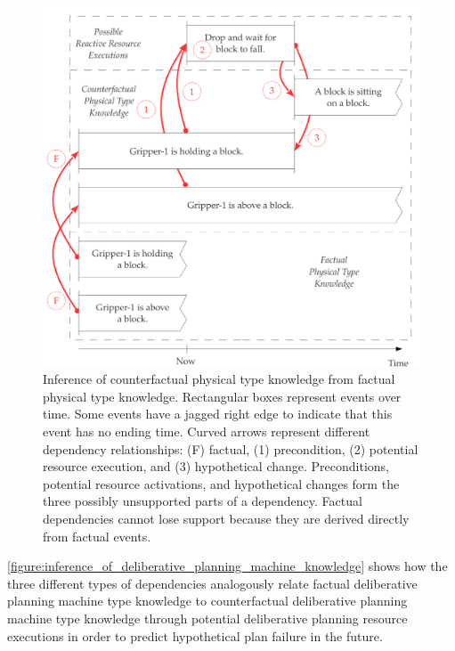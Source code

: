 \begin{figure}[h]
\centering
\includegraphics[width=12cm]{gfx/inference_of_physical_knowledge}
\caption[Inference of counterfactual physical type knowledge from
  factual physical type knowledge.]{Inference of counterfactual
  physical type knowledge from factual physical type knowledge.
  Rectangular boxes represent events over time.  Some events have a
  jagged right edge to indicate that this event has no ending time.
  Curved arrows represent different dependency relationships: (F)
  factual, (1) precondition, (2) potential resource execution, and (3)
  hypothetical change.  Preconditions, potential resource activations,
  and hypothetical changes form the three possibly unsupported parts
  of a dependency.  Factual dependencies cannot lose support because
  they are derived directly from factual events.}
\label{figure:inference_of_physical_knowledge}
\end{figure}
{\mbox{\autoref{figure:inference_of_deliberative_planning_machine_knowledge}}}
shows how the three different types of dependencies analogously relate
factual deliberative planning machine type knowledge to counterfactual
deliberative planning machine type knowledge through potential
deliberative planning resource executions in order to predict
hypothetical plan failure in the future.
